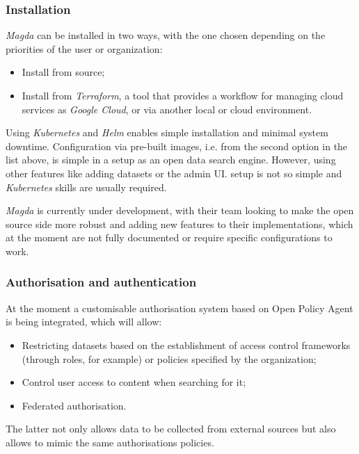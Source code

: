 \newpage  
  
\subsubsection{Installation}
  
\textit{Magda} can be installed in two ways, with the one chosen depending on the priorities of the user or organization:
  
\begin{itemize}
    \item Install from source;
    \item Install from \textit{Terraform}, a tool that provides a workflow for managing cloud services as \textit{Google Cloud}, or via another local or cloud environment.
\end{itemize}

Using \textit{Kubernetes} and \textit{Helm} enables simple installation and minimal system downtime. Configuration via pre-built images, i.e. from the second option in the list above, is simple in a setup as an open data search engine. However, using other features like adding datasets or the admin UI. setup is not so simple and \textit{Kubernetes} skills are usually required.
    
\textit{Magda} is currently under development, with their team looking to make the open source side more robust and adding new features to their implementations, which at the moment are not fully documented or require specific configurations to work.
    
\subsubsection{Authorisation and authentication}
  
At the moment a customisable authorisation system based on Open Policy Agent is being integrated, which will allow:
  
\begin{itemize}
  \item Restricting datasets based on the establishment of access control frameworks (through roles, for example) or policies specified by the organization;
  \item Control user access to content when searching for it;
  \item Federated authorisation.
  \end{itemize}
  
The latter not only allows data to be collected from external sources but also allows to mimic the same authorisations policies.
  
